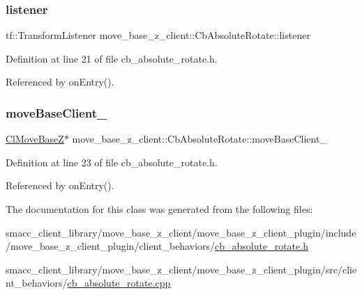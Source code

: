 \subsubsection{\texorpdfstring{listener}{listener}}
{\footnotesize\ttfamily tf\+::\+Transform\+Listener move\+\_\+base\+\_\+z\+\_\+client\+::\+Cb\+Absolute\+Rotate\+::listener}



Definition at line 21 of file cb\+\_\+absolute\+\_\+rotate.\+h.



Referenced by on\+Entry().

\mbox{\label{classmove__base__z__client_1_1CbAbsoluteRotate_a2a96d8ec86bb2802391b044da7f10daf}} 
\subsubsection{\texorpdfstring{move\+Base\+Client\+\_\+}{moveBaseClient\_}}
{\footnotesize\ttfamily \hyperlink{classmove__base__z__client_1_1ClMoveBaseZ}{Cl\+Move\+BaseZ}$\ast$ move\+\_\+base\+\_\+z\+\_\+client\+::\+Cb\+Absolute\+Rotate\+::move\+Base\+Client\+\_\+}



Definition at line 23 of file cb\+\_\+absolute\+\_\+rotate.\+h.



Referenced by on\+Entry().



The documentation for this class was generated from the following files\+:\begin{DoxyCompactItemize}
\item 
smacc\+\_\+client\+\_\+library/move\+\_\+base\+\_\+z\+\_\+client/move\+\_\+base\+\_\+z\+\_\+client\+\_\+plugin/include/move\+\_\+base\+\_\+z\+\_\+client\+\_\+plugin/client\+\_\+behaviors/\hyperlink{cb__absolute__rotate_8h}{cb\+\_\+absolute\+\_\+rotate.\+h}\item 
smacc\+\_\+client\+\_\+library/move\+\_\+base\+\_\+z\+\_\+client/move\+\_\+base\+\_\+z\+\_\+client\+\_\+plugin/src/client\+\_\+behaviors/\hyperlink{cb__absolute__rotate_8cpp}{cb\+\_\+absolute\+\_\+rotate.\+cpp}\end{DoxyCompactItemize}
